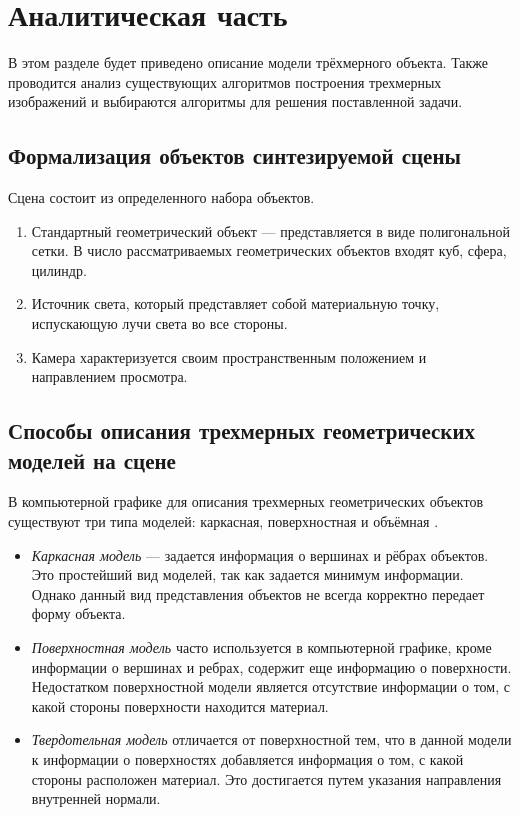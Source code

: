 \section{Аналитическая часть}

В этом разделе будет приведено описание модели трёхмерного объекта.
Также проводится анализ существующих алгоритмов построения трехмерных изображений и выбираются алгоритмы для решения поставленной задачи.

\subsection{Формализация объектов синтезируемой сцены}

Сцена состоит из определенного набора объектов.
\begin{enumerate}
	\item Стандартный геометрический объект --- представляется в виде полигональной сетки. В число рассматриваемых геометрических объектов входят куб, сфера, цилиндр.
	\item Источник света, который представляет собой материальную точку, испускающую лучи света во все стороны.
	\item Камера характеризуется своим пространственным положением и направлением просмотра.
\end{enumerate}

\subsection{Способы описания трехмерных геометрических моделей на сцене}

В компьютерной графике для описания трехмерных геометрических объектов существуют три типа моделей: каркасная, поверхностная и объёмная \cite{applicationcg}.

\begin{itemize}
	\item \textit{Каркасная модель} --- задается информация о вершинах и рёбрах объектов.
	Это простейший вид моделей, так как задается минимум информации. Однако данный вид представления объектов не всегда корректно
	передает форму объекта.
	\item \textit{Поверхностная модель} часто используется в компьютерной графике, кроме информации о вершинах и ребрах, содержит еще информацию о поверхности.
	Недостатком поверхностной модели является отсутствие информации о том, с какой стороны поверхности находится материал.
	\item \textit{Твердотельная модель} отличается от поверхностной тем, что в данной модели к информации о поверхностях добавляется информация о том, с какой стороны расположен материал. Это достигается путем указания направления внутренней нормали.
\end{itemize}

